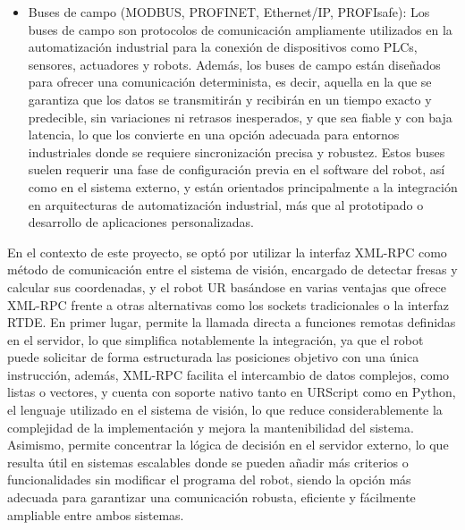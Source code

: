 \begin{itemize}
     \pagebreak 
     \item Buses de campo (MODBUS, PROFINET, Ethernet/IP, PROFIsafe): Los buses de campo son protocolos de comunicación ampliamente utilizados en la automatización industrial para la conexión de dispositivos como PLCs, sensores, actuadores y robots. Además, los buses de campo están diseñados para ofrecer una comunicación determinista, es decir, aquella en la que se garantiza que los datos se transmitirán y recibirán en un tiempo exacto y predecible, sin variaciones ni retrasos inesperados, y que sea fiable y con baja latencia, lo que los convierte en una opción adecuada para entornos industriales donde se requiere sincronización precisa y robustez. Estos buses suelen requerir una fase de configuración previa en el software del robot, así como en el sistema externo, y están orientados principalmente a la integración en arquitecturas de automatización industrial, más que al prototipado o desarrollo de aplicaciones personalizadas.
    
\end{itemize}

En el contexto de este proyecto, se optó por utilizar la interfaz XML-RPC como método de comunicación entre el sistema de visión, encargado de detectar fresas y calcular sus coordenadas, y el robot UR basándose en varias ventajas que ofrece XML-RPC frente a otras alternativas como los sockets tradicionales o la interfaz RTDE. En primer lugar, permite la llamada directa a funciones remotas definidas en el servidor, lo que simplifica notablemente la integración, ya que el robot puede solicitar de forma estructurada las posiciones objetivo con una única instrucción, además, XML-RPC facilita el intercambio de datos complejos, como listas o vectores, y cuenta con soporte nativo tanto en URScript como en Python, el lenguaje utilizado en el sistema de visión, lo que reduce considerablemente la complejidad de la implementación y mejora la mantenibilidad del sistema. Asimismo, permite concentrar la lógica de decisión en el servidor externo, lo que resulta útil en sistemas escalables donde se pueden añadir más criterios o funcionalidades sin modificar el programa del robot, siendo la opción más adecuada para garantizar una comunicación robusta, eficiente y fácilmente ampliable entre ambos sistemas.

